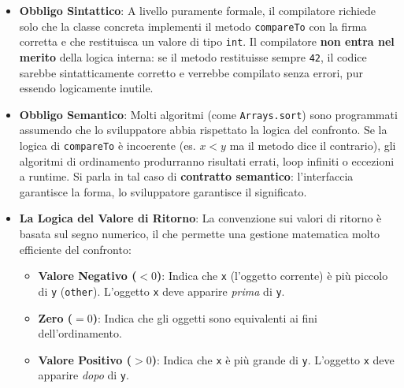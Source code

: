 \begin{itemize}
    \item \textbf{Obbligo Sintattico}: A livello puramente formale, il compilatore richiede solo che la classe concreta implementi il metodo \texttt{compareTo} con la firma corretta e che restituisca un valore di tipo \texttt{int}. Il compilatore \textbf{non entra nel merito} della logica interna: se il metodo restituisse sempre \texttt{42}, il codice sarebbe sintatticamente corretto e verrebbe compilato senza errori, pur essendo logicamente inutile.
    \item \textbf{Obbligo Semantico}:  Molti algoritmi (come \texttt{Arrays.sort}) sono programmati assumendo che lo sviluppatore abbia rispettato la logica del confronto.
    Se la logica di \texttt{compareTo} è incoerente (es. $x < y$ ma il metodo dice il contrario), gli algoritmi di ordinamento produrranno risultati errati, loop infiniti o eccezioni a runtime. Si parla in tal caso di \textbf{contratto semantico}: l'interfaccia garantisce la forma, lo sviluppatore garantisce il significato.
    \item \textbf{La Logica del Valore di Ritorno}: La convenzione sui valori di ritorno è basata sul segno numerico, il che permette una gestione matematica molto efficiente del confronto:

        \begin{itemize}
            \item \textbf{Valore Negativo ($< 0$)}: Indica che \texttt{x} (l'oggetto corrente) è più piccolo di \texttt{y} (\texttt{other}). L'oggetto \texttt{x} deve apparire \textit{prima} di \texttt{y}.
            \item \textbf{Zero ($= 0$)}: Indica che gli oggetti sono equivalenti ai fini dell'ordinamento.
            \item \textbf{Valore Positivo ($> 0$)}: Indica che \texttt{x} è più grande di \texttt{y}. L'oggetto \texttt{x} deve apparire \textit{dopo} di \texttt{y}.
        \end{itemize}

\end{itemize}

